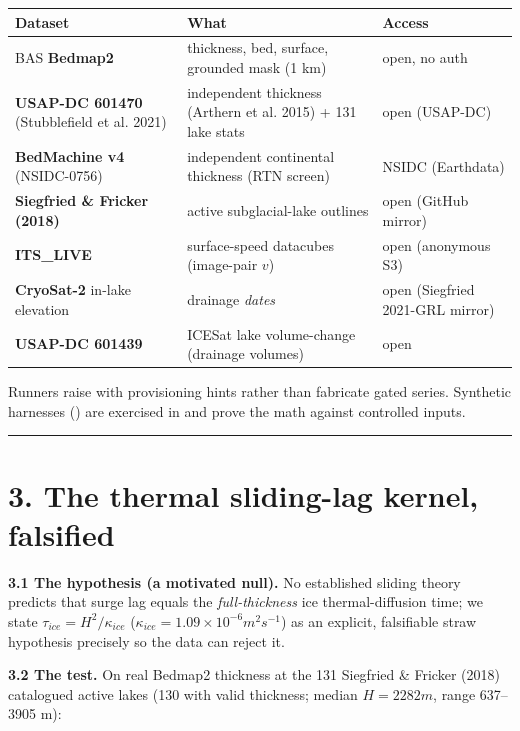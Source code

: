 \documentclass[11pt]{article}
\begin{document}
\begin{center}\small
\begin{tabularx}{\linewidth}{>{\raggedright\arraybackslash}X>{\raggedright\arraybackslash}X>{\raggedright\arraybackslash}X}
\toprule
Dataset & What & Access \\
\midrule
BAS \textbf{Bedmap2} & thickness, bed, surface, grounded mask (1 km) & open, no auth \\
\textbf{USAP-DC 601470} (Stubblefield et al. 2021) & independent thickness (Arthern et al. 2015) + 131 lake stats & open (USAP-DC) \\
\textbf{BedMachine v4} (NSIDC-0756) & independent continental thickness (RTN screen) & NSIDC (Earthdata) \\
\textbf{Siegfried \& Fricker (2018)} & 131 active subglacial-lake outlines & open (GitHub mirror) \\
\textbf{ITS\_LIVE} & surface-speed datacubes (image-pair $v$) & open (anonymous S3) \\
\textbf{CryoSat-2} in-lake elevation & drainage \emph{dates} & open (Siegfried 2021-GRL mirror) \\
\textbf{USAP-DC 601439} & ICESat lake volume-change (drainage volumes) & open \\
\bottomrule
\end{tabularx}
\end{center}


Runners raise  with provisioning hints rather than fabricate gated series. Synthetic harnesses () are exercised in  and prove the math against controlled inputs.


\medskip\hrule\medskip


\section*{3. The thermal sliding-lag kernel, falsified}


\textbf{3.1 The hypothesis (a motivated null).} No established sliding theory predicts that surge lag equals the \emph{full-thickness} ice thermal-diffusion time; we state $\tau _{ice} = H^{2}/\kappa _{ice}$ ($\kappa _{ice}=1.09\times 10^{-6} m^{2} s^{-1}$) as an explicit, falsifiable straw hypothesis precisely so the data can reject it.


\textbf{3.2 The test.} On real Bedmap2 thickness at the 131 Siegfried \& Fricker (2018) catalogued active lakes (130 with valid thickness; median $H=2282 m$, range 637–3905 m):
\end{document}
